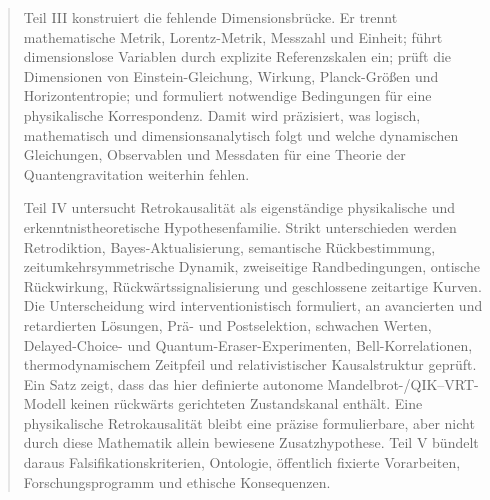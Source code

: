 \documentclass[11pt,a4paper]{article}
\theoremstyle{remark}
\begin{document}
\begin{abstract}
Teil III konstruiert die fehlende Dimensionsbrücke. Er trennt mathematische
Metrik, Lorentz-Metrik, Messzahl und Einheit; führt dimensionslose Variablen
durch explizite Referenzskalen ein; prüft die Dimensionen von
Einstein-Gleichung, Wirkung, Planck-Größen und Horizontentropie; und formuliert
notwendige Bedingungen für eine physikalische Korrespondenz. Damit wird
präzisiert, was logisch, mathematisch und dimensionsanalytisch folgt und
welche dynamischen Gleichungen, Observablen und Messdaten für eine Theorie der
Quantengravitation weiterhin fehlen.

Teil IV untersucht Retrokausalität als eigenständige physikalische und
erkenntnis\-theoretische Hypothesenfamilie. Strikt unterschieden werden
Retrodiktion, Bayes-Aktualisierung, semantische Rückbestimmung,
zeitumkehr\-symmetrische Dynamik, zweiseitige Randbedingungen, ontische
Rückwirkung, Rückwärts\-signalisierung und geschlossene zeitartige Kurven. Die
Unterscheidung wird interventionistisch formuliert, an avancierten und
retardierten Lösungen, Prä- und Postselektion, schwachen Werten,
Delayed-Choice- und Quantum-Eraser-Experimenten, Bell-Korrelationen,
thermodynamischem Zeitpfeil und relativistischer Kausalstruktur geprüft. Ein
Satz zeigt, dass das hier definierte autonome Mandelbrot-/QIK--VRT-Modell
keinen rückwärts gerichteten Zustandskanal enthält. Eine physikalische
Retrokausalität bleibt eine präzise formulierbare, aber nicht durch diese
Mathematik allein bewiesene Zusatzhypothese. Teil V bündelt daraus
Falsifikationskriterien, Ontologie, öffentlich fixierte Vorarbeiten,
Forschungsprogramm und ethische Konsequenzen.
\end{abstract}
\end{document}
